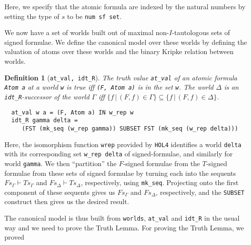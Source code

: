 \documentclass[a4paper]{article}
\newtheorem{definition}{Definition}
\newcommand{\hol}{\texttt{HOL4}}
\begin{document}
Here, we specify that the atomic formula are indexed by the natural
numbers by setting the type of $s$ to be \texttt{num sf set}.

We now have a set of worlds built out of maximal non-$I$-tautologous
sets of signed formulae. We define the canonical model over these
worlds by defining the valuation of atoms over these worlds and the
binary Kripke relation between worlds.  

\begin{definition}[\texttt{at\_val, idt\_R}]\label{at-val,idt-R}
  The truth value \texttt{at\_val} of an atomic formula \texttt{Atom
    a} at a world \texttt{w} is true iff \texttt{(F, Atom a)} is in
  the set \texttt{w}.
  The world $\Delta$ is an \texttt{idt\_R}-successor of the world
  $\Gamma$ iff
  $\{f \,|\, (F, f) \in \Gamma\} \subseteq \{f \,|\, (F, f) \in
  \Delta\}$.
\begin{verbatim}
  at_val w a = (F, Atom a) IN w_rep w
  idt_R gamma delta = 
     (FST (mk_seq (w_rep gamma)) SUBSET FST (mk_seq (w_rep delta)))
\end{verbatim}
\end{definition}

Here, the isomorphism function \texttt{wrep} provided by \hol{}
identifies a world \texttt{delta} with its corresponding
set \texttt{w\_rep delta} of signed-formulae, and similarly for world
\texttt{gamma}. We then ``partition'' the $F$-signed formulae from the
$T$-signed formulae from these
sets of signed formulae by turning each into the sequents
$Fs_{\Gamma} \vdash Ts_{\Gamma}$ and
$Fs_{\Delta} \vdash Ts_{\Delta}$, respectively, using \texttt{mk\_seq}.
Projecting onto the first component of these sequents gives us
$Fs_{\Gamma}$ and $Fs_{\Delta}$, respectively,
and the \texttt{SUBSET} construct then gives us the desired result.

The canonical model is thus built from \texttt{worlds},
\texttt{at\_val} and \texttt{idt\_R} in the usual way and we need to
prove the Truth Lemma.
For proving the Truth Lemma, we proved
\end{document}

